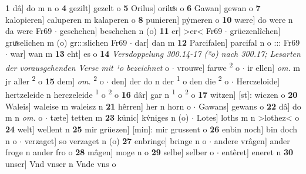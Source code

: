 \documentclass[8pt,a4paper,notitlepage]{article}
\begin{document}
\begin{table}[ht]
\begin{minipage}[t]{0.5\linewidth}
\textbf{1} dâ] do m n o \textbf{4} gezilt] gezelt o \textbf{5} Orilus] oriluͯs o \textbf{6} Gawan] gewan o \textbf{7} kalopieren] caluperen m kalaperen o \textbf{8} punieren] pẏmeren o \textbf{10} wære] do were n da were Fr69  $\cdot$ geschehen] beschehen n (o) \textbf{11} er] >er< Fr69  $\cdot$ grüezenlîchen] gruͯselichen m (o) gr:::slichen Fr69  $\cdot$ dar] dan m \textbf{12} Parcifalen] parcifal n o ::: Fr69  $\cdot$ war] wan m \textbf{13} eht] es o \textbf{14} \textit{Versdoppelung 300.14-17 (²o) nach 300.17; Lesarten der vorausgehenden Verse mit ¹o bezeichnet} o   $\cdot$ vrouwe] farwe \textsuperscript{2}\hspace{-1.3mm} o  $\cdot$ ir ellen] \textit{om.} m jr aller \textsuperscript{2}\hspace{-1.3mm} o \textbf{15} dem] \textit{om.} \textsuperscript{2}\hspace{-1.3mm} o  $\cdot$ den] der do n der \textsuperscript{1}\hspace{-1.3mm} o den die \textsuperscript{2}\hspace{-1.3mm} o  $\cdot$ Herczeloide] hertzeleide n herczeleide \textsuperscript{1}\hspace{-1.3mm} o \textsuperscript{2}\hspace{-1.3mm} o \textbf{16} dâr] gar n \textsuperscript{1}\hspace{-1.3mm} o \textsuperscript{2}\hspace{-1.3mm} o \textbf{17} witzen] [st]: wiczen o \textbf{20} Waleis] waleise m waleisz n \textbf{21} hêrren] her n horn o  $\cdot$ Gawans] gewans o \textbf{22} dâ] do m n \textit{om.} o  $\cdot$ tæte] tetten m \textbf{23} künic] kv́niges n (o)  $\cdot$ Lotes] loths m n >lothez< o \textbf{24} welt] wellent n \textbf{25} mir grüezen] [min]: mir grussent o \textbf{26} enbin noch] bin doch n o  $\cdot$ verzaget] so verzaget n (o) \textbf{27} enbringe] bringe n o  $\cdot$ andere vrâgen] ander froge n ander fro o \textbf{28} mâgen] moge n o \textbf{29} selbe] selber o  $\cdot$ entêret] eneret n \textbf{30} unser] Vnd vnser n Vnde vns o \newline
\end{minipage}
\end{table}
\newpage
\end{document}
